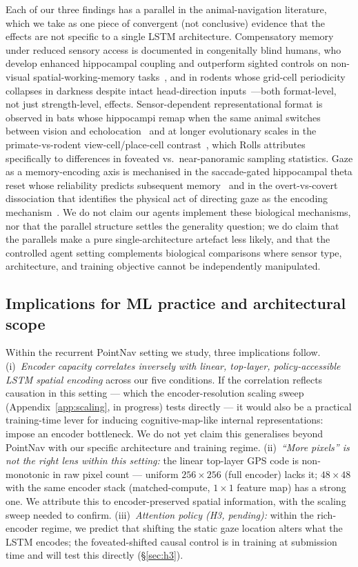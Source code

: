 \documentclass{article}
\begin{document}
Each of our three findings has a parallel in the animal-navigation literature, which we take as one piece of convergent (not conclusive) evidence that the effects are not specific to a single LSTM architecture. Compensatory memory under reduced sensory access is documented in congenitally blind humans, who develop enhanced hippocampal coupling and outperform sighted controls on non-visual spatial-working-memory tasks~\citep{kupers2014blind}, and in rodents whose grid-cell periodicity collapses in darkness despite intact head-direction inputs~\citep{chen2016grid}---both format-level, not just strength-level, effects. Sensor-dependent representational format is observed in bats whose hippocampi remap when the same animal switches between vision and echolocation~\citep{geva2016remapping} and at longer evolutionary scales in the primate-vs-rodent view-cell/place-cell contrast~\citep{rolls2024why}, which Rolls attributes specifically to differences in foveated vs.\ near-panoramic sampling statistics. Gaze as a memory-encoding axis is mechanised in the saccade-gated hippocampal theta reset whose reliability predicts subsequent memory~\citep{jutras2013saccades} and in the overt-vs-covert dissociation that identifies the physical act of directing gaze as the encoding mechanism~\citep{tas2016overt}. We do not claim our agents implement these biological mechanisms, nor that the parallel structure settles the generality question; we do claim that the parallels make a pure single-architecture artefact less likely, and that the controlled agent setting complements biological comparisons where sensor type, architecture, and training objective cannot be independently manipulated.

\subsection{Implications for ML practice and architectural scope}

Within the recurrent PointNav setting we study, three implications follow. (i)~\emph{Encoder capacity correlates inversely with linear, top-layer, policy-accessible LSTM spatial encoding} across our five conditions. If the correlation reflects causation in this setting --- which the encoder-resolution scaling sweep (Appendix~\ref{app:scaling}, in progress) tests directly --- it would also be a practical training-time lever for inducing cognitive-map-like internal representations: impose an encoder bottleneck. We do not yet claim this generalises beyond PointNav with our specific architecture and training regime. (ii)~\emph{``More pixels'' is not the right lens within this setting:} the linear top-layer GPS code is non-monotonic in raw pixel count --- uniform $256{\times}256$ (full encoder) lacks it; $48{\times}48$ with the same encoder stack (matched-compute, $1{\times}1$ feature map) has a strong one. We attribute this to encoder-preserved spatial information, with the scaling sweep needed to confirm. (iii)~\emph{Attention policy (H3, pending):} within the rich-encoder regime, we predict that shifting the static gaze location alters what the LSTM encodes; the foveated-shifted causal control is in training at submission time and will test this directly (§\ref{sec:h3}).
\end{document}
